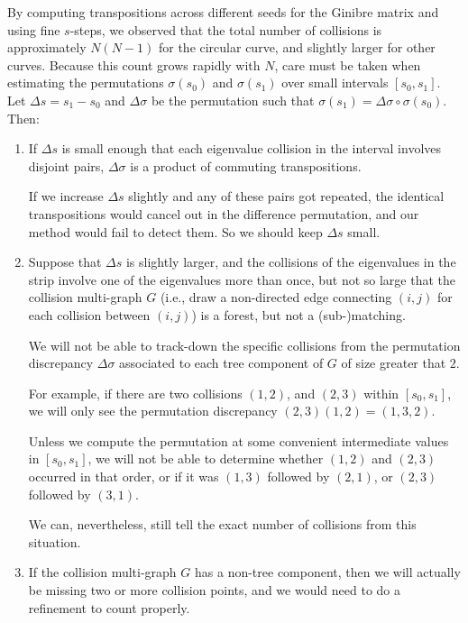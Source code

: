 \documentclass{article}
\begin{document}
	By computing transpositions across different seeds for the Ginibre matrix 
	and using fine $s$-steps, we observed that the total number of collisions 
	is approximately $N(N-1)$ for the circular curve, and slightly larger for other curves. 
	Because this count grows rapidly with $N$, care must be taken when estimating 
	the permutations $\sigma(s_0)$ and $\sigma(s_1)$ over small intervals $[s_0,s_1]$. 
	Let $\Delta s = s_1 - s_0$ and $\Delta \sigma$ be the permutation such that 
	$\sigma(s_1) = \Delta \sigma \circ \sigma(s_0)$. Then:
	\begin{enumerate}
		\item If $\Delta s$ is small enough that each eigenvalue collision 
		in the interval involves disjoint pairs, $\Delta \sigma$ is a product of commuting transpositions.
		
		If we increase $\Delta s$ slightly and any of these pairs got repeated,
		the identical transpositions would cancel out in the difference permutation, 
		and our method would fail to detect them. So we should keep $\Delta s$ small.	

		\item Suppose that $\Delta s$ is slightly larger,
		and the collisions
		of the eigenvalues in the strip involve
		one of the eigenvalues more than once,
		but not so large that the collision multi-graph $G$
		(i.e., draw a non-directed edge connecting $(i,j)$
		for each collision between $(i, j)$)
		is a forest, but not a (sub-)matching. 
		
		We will not be able to track-down 
		the specific collisions 
		from the permutation discrepancy $\Delta\sigma$ 
		associated to each tree component of $G$ of size greater that $2$.

		For example, if there are two collisions 
		$(1,2)$, and $(2,3)$ within $[s_0,s_1]$,
		we will only see the permutation discrepancy 
		$(2,3)(1,2)=(1,3,2)$.
	
		Unless we compute the permutation at some convenient 
		intermediate values in $[s_0,s_1]$, 
		we will not be able to determine whether 
		$(1,2)$ and $(2,3)$ occurred in that order,
		or if it was $(1,3)$ followed by $(2,1)$, 
		or $(2,3)$ followed by $(3,1)$.
	
		We can, nevertheless, still 
		tell the exact number of collisions from this situation.

		\item If the collision multi-graph $G$ has a non-tree component, 
		then we will actually be missing two or more collision points, 
		and we would need to do a refinement to count properly. 

	\end{enumerate}	
\end{document}
